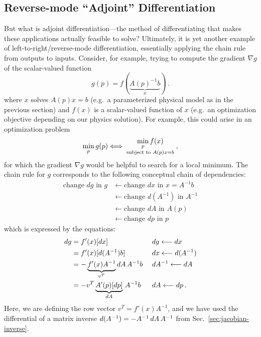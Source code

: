 \subsection{Reverse-mode ``Adjoint'' Differentiation}
\label{sec:adjoint-method}

But what is adjoint differentiation---the method of differentiating that makes these applications actually feasible to solve? Ultimately, it is yet another example of left-to-right/reverse-mode differentiation, essentially applying the chain rule from outputs to inputs. Consider, for example, trying to compute the gradient $\nabla g$ of the scalar-valued function 
$$
g(p) = f(\underbrace{A(p)^{-1} b}_x) \, .
$$
where $x$ solves $A(p) x  = b$ (e.g.~a parameterized physical model as in the previous section) and $f(x)$ is a scalar-valued function of $x$ (e.g.~an optimization objective depending on our physics solution).  For example, this could arise in an optimization problem 
$$
 \min_p g(p) \Longleftrightarrow \substack{  \text{ \normalsize  $\displaystyle \min_p f(x)$} \\ \text{ subject to } A(p)x = b }\; ,
$$
for which the gradient $\nabla g$ would be helpful to search for a local minimum.
The chain rule for $g$ corresponds to the following conceptual chain of dependencies:
\begin{align*}
\text{change $dg$ in $g$} &\longleftarrow 
\text{change $dx$ in $x = A^{-1} b$}  \\
&\longleftarrow \text{change $d(A^{-1})$ in $A^{-1}$} \\
&\longleftarrow 
\text{change $dA$ in $A(p)$}  \\
&\longleftarrow \text{change $dp$ in $p$}
\end{align*}
which is expressed by the equations:
\begin{align*}
d g &= f'(x) [d x] &\text{ } & dg \longleftarrow dx    \\
& = f'(x) [d (A^{-1}) b] &\text{ } & dx \longleftarrow d(A^{-1})   \\
& = - \underbrace{f'(x) A^{-1}}_{v^T} d A \, A^{-1} b &\text{ } & dA^{-1} \longleftarrow dA \\
& = - v^T \underbrace{A'(p)[dp]}_{dA} \, A^{-1} b &\text{ } &dA \longleftarrow dp \, .
\end{align*}
Here, we are defining the row vector $v^T = f'(x) A^{-1}$, and we have used the differential of a matrix inverse $d(A^{-1})=-A^{-1}\,dA\,A^{-1}$ from Sec.~\ref{sec:jacobian-inverse}.

